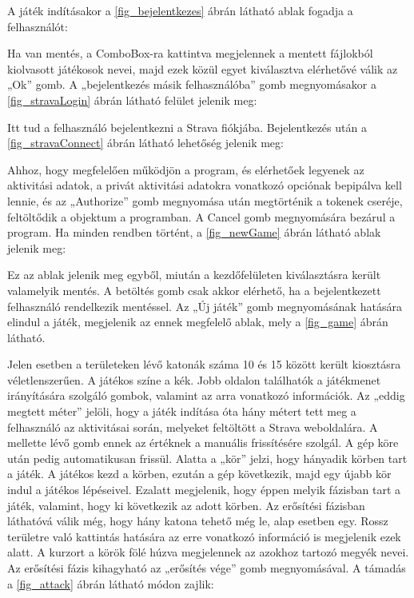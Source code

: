 A játék indításakor a \ref{fig_bejelentkezes} ábrán látható ablak fogadja a felhasználót: 



Ha van mentés, a ComboBox-ra kattintva megjelennek a mentett fájlokból kiolvasott játékosok nevei, majd ezek közül egyet kiválasztva elérhetővé válik az „Ok” gomb.
A „bejelentkezés másik felhasználóba” gomb megnyomásakor a \ref{fig_stravaLogin} ábrán látható felület jelenik meg: 



Itt tud a felhasználó bejelentkezni a Strava fiókjába.
Bejelentkezés után a \ref{fig_stravaConnect} ábrán látható lehetőség jelenik meg: 




Ahhoz, hogy megfelelően működjön a program, és elérhetőek legyenek az aktivitási adatok, a privát aktivitási adatokra vonatkozó opciónak bepipálva kell lennie, és az „Authorize” gomb megnyomása után megtörténik a tokenek cseréje, feltöltődik a  objektum a programban.
A Cancel gomb megnyomására bezárul a program.
Ha minden rendben történt, a \ref{fig_newGame} ábrán látható ablak jelenik meg: 



Ez az ablak jelenik meg egyből, miután a kezdőfelületen kiválasztásra került valamelyik mentés.
A betöltés gomb csak akkor elérhető, ha a bejelentkezett felhasználó rendelkezik mentéssel.
Az „Új játék” gomb megnyomásának hatására elindul a játék, megjelenik az ennek megfelelő ablak, mely a \ref{fig_game} ábrán látható. 


Jelen esetben a területeken lévő katonák száma 10 és 15 között került kiosztásra véletlenszerűen.
A játékos színe a kék.
Jobb oldalon találhatók a játékmenet irányítására szolgáló gombok, valamint az arra vonatkozó információk.
Az „eddig megtett méter” jelöli, hogy a játék indítása óta hány métert tett meg a felhasználó az aktivitásai során, melyeket feltöltött a Strava weboldalára.
A mellette lévő gomb ennek az értéknek a manuális frissítésére szolgál.
A gép köre után pedig automatikusan frissül.
Alatta a „kör” jelzi, hogy hányadik körben tart a játék.
A játékos kezd a körben, ezután a gép következik, majd egy újabb kör indul a játékos lépéseivel.
Ezalatt megjelenik, hogy éppen melyik fázisban tart a játék, valamint, hogy ki következik az adott körben.
Az erősítési fázisban láthatóvá válik még, hogy hány katona tehető még le, alap esetben egy.
Rossz területre való kattintás hatására az erre vonatkozó információ is megjelenik ezek alatt.
A kurzort a körök fölé húzva megjelennek az azokhoz tartozó megyék nevei.
Az erősítési fázis kihagyható az „erősítés vége” gomb megnyomásával.
A támadás a \ref{fig_attack} ábrán látható módon zajlik: 

